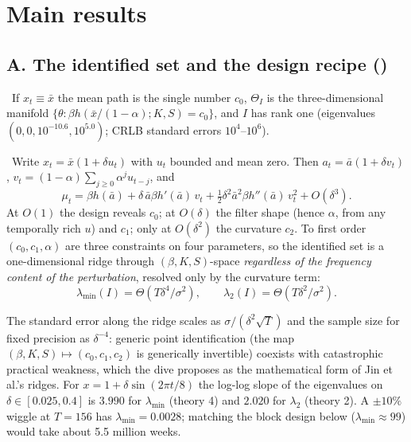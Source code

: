 \section{Main results}

\subsection{A. The identified set and the design recipe ()}

\begin{proposition}
\label{ident:prop:constant}
\tagEstablished\ If $x_t \equiv \bar x$ the mean path is the single number $c_0$, $\Theta_I$ is the three-dimensional manifold $\{\theta : \beta h(\bar x/(1-\alpha); K, S) = c_0\}$, and $I$ has rank one (eigenvalues $(0, 0, 10^{-10.6}, 10^{5.0})$; CRLB standard errors $10^4$--$10^6$).
\end{proposition}

\begin{law}
\label{ident:law:delta4}
\tagEstablished\ Write $x_t = \bar x(1 + \delta u_t)$ with $u_t$ bounded and mean zero. Then $a_t = \bar a(1 + \delta v_t)$, $v_t = (1-\alpha)\sum_{j\ge0}\alpha^j u_{t-j}$, and
\begin{equation}
\mu_t = \beta h(\bar a) + \delta\,\bar a\beta h'(\bar a)\,v_t + \tfrac12\delta^2\bar a^2\beta h''(\bar a)\,v_t^2 + O(\delta^3).
\label{ident:eq:expansion}
\end{equation}
At $O(1)$ the design reveals $c_0$; at $O(\delta)$ the filter shape (hence $\alpha$, from any temporally rich $u$) and $c_1$; only at $O(\delta^2)$ the curvature $c_2$. To first order $(c_0, c_1, \alpha)$ are three constraints on four parameters, so the identified set is a one-dimensional ridge through $(\beta, K, S)$-space \emph{regardless of the frequency content of the perturbation}, resolved only by the curvature term:
\begin{equation}
\lambda_{\min}(I) = \Theta(T\delta^4/\sigma^2), \qquad \lambda_2(I) = \Theta(T\delta^2/\sigma^2).
\label{ident:eq:delta4}
\end{equation}
\end{law}

The standard error along the ridge scales as $\sigma/(\delta^2\sqrt T)$ and the sample size for fixed precision as $\delta^{-4}$: generic point identification (the map $(\beta, K, S) \mapsto (c_0, c_1, c_2)$ is generically invertible) coexists with catastrophic practical weakness, which the dive proposes as the mathematical form of Jin et al.'s ridges. For $x = 1 + \delta\sin(2\pi t/8)$ the log-log slope of the eigenvalues on $\delta \in [0.025, 0.4]$ is $3.990$ for $\lambda_{\min}$ (theory 4) and $2.020$ for $\lambda_2$ (theory 2). A $\pm10\%$ wiggle at $T = 156$ has $\lambda_{\min} = 0.0028$; matching the block design below ($\lambda_{\min} \approx 99$) would take about 5.5 million weeks.

